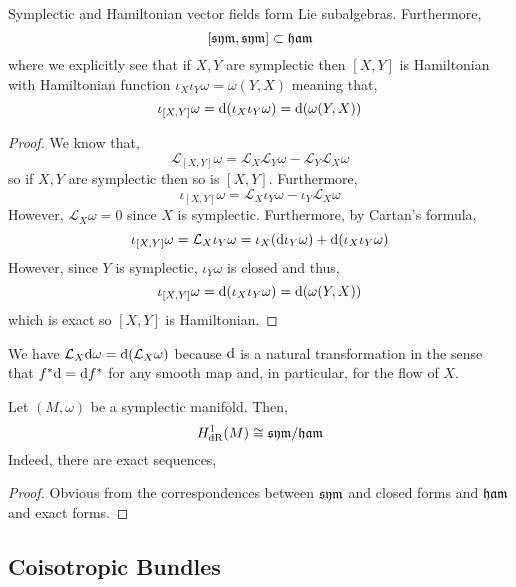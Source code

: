 \documentclass[12pt]{extarticle}
\renewcommand{\L}{\mathcal{L}}
\newcommand{\dR}{\mathrm{dR}}
\begin{document}
\begin{lemma}
Symplectic and Hamiltonian vector fields form Lie subalgebras. Furthermore, 
\[ [ \mathfrak{sym}, \mathfrak{sym} ] \subset \mathfrak{ham} \]
where we explicitly see that if $X, Y$ are symplectic then $[X, Y]$ is Hamiltonian with Hamiltonian function $\iota_X \iota_Y \omega = \omega(Y, X)$ meaning that,
\[ \iota_{[X, Y]} \omega = \mathrm{d}{(\iota_X \iota_Y \omega)} = \mathrm{d}(\omega(Y, X)) \] 
\end{lemma}

\begin{proof}
We know that,
\[ \L_{[X,Y]} \omega = \L_X \L_Y \omega - \L_Y \L_X \omega \]
so if $X,Y$ are symplectic then so is $[X, Y]$. Furthermore, 
\[ \iota_{[X, Y]} \omega = \L_X \iota_Y \omega - \iota_Y \L_X \omega \]
However, $\L_X \omega = 0$ since $X$ is symplectic. Furthermore, by Cartan's formula,
\[ \iota_{[X, Y]} \omega = \L_X \iota_Y \omega = \iota_X (\d \iota_Y \omega) + \d( \iota_X \iota_Y \omega) \]
However, since $Y$ is symplectic, $\iota_Y \omega$ is closed and thus,
\[ \iota_{[X, Y]} \omega = \mathrm{d} (\iota_X \iota_Y \omega) = \mathrm{d}{(\omega(Y, X))} \]
which is exact so $[X, Y]$ is Hamiltonian. 
\end{proof}

\begin{remark}
We have $\L_X \d{\omega} = \d{(\L_X \omega)}$ because $\mathrm{d}$ is a natural transformation in the sense that $f^* \mathrm{d} = \mathrm{d} f^*$ for any smooth map and, in particular, for the flow of $X$. 
\end{remark}

\begin{prop}
Let $(M, \omega)$ be a symplectic manifold. Then,
\[ H^1_{\dR}(M) \cong \sym / \ham \]
Indeed, there are exact sequences,
\begin{center}
\end{center}
\end{prop}

\begin{proof}
Obvious from the correspondences between $\mathfrak{sym}$ and closed forms and $\mathfrak{ham}$ and exact forms.
\end{proof}


\subsection{Coisotropic Bundles}
\end{document}

